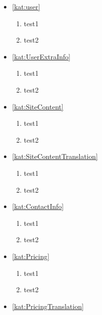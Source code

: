 \begin{itemize}[label={\textbf{Reguły dla}}, wide, labelwidth=!, labelindent=0pt]
    \setlength\itemsep{1em}
    \item\ref{kat:user}
    \begin{enumerate}[label={\textbf{REG/\protect\threedigits{\arabic{enumi}}}}, wide, labelwidth=!]
        \item test1
        \item test2
    \end{enumerate}
    \item\ref{kat:UserExtraInfo}
    \begin{enumerate}[label={\textbf{REG/\protect\threedigits{\arabic{enumi}}}}, wide, labelwidth=!, resume]
        \item test1
        \item test2
    \end{enumerate}
    \item\ref{kat:SiteContent}
    \begin{enumerate}[label={\textbf{REG/\protect\threedigits{\arabic{enumi}}}}, wide, labelwidth=!, resume]
        \item test1
        \item test2
    \end{enumerate}
    \item\ref{kat:SiteContentTranslation}
    \begin{enumerate}[label={\textbf{REG/\protect\threedigits{\arabic{enumi}}}}, wide, labelwidth=!, resume]
        \item test1
        \item test2
    \end{enumerate}
    \item\ref{kat:ContactInfo}
    \begin{enumerate}[label={\textbf{REG/\protect\threedigits{\arabic{enumi}}}}, wide, labelwidth=!, resume]
        \item test1
        \item test2
    \end{enumerate}
    \item\ref{kat:Pricing}
    \begin{enumerate}[label={\textbf{REG/\protect\threedigits{\arabic{enumi}}}}, wide, labelwidth=!, resume]
        \item test1
        \item test2
    \end{enumerate}
    \item\ref{kat:PricingTranslation}

\end{itemize}
